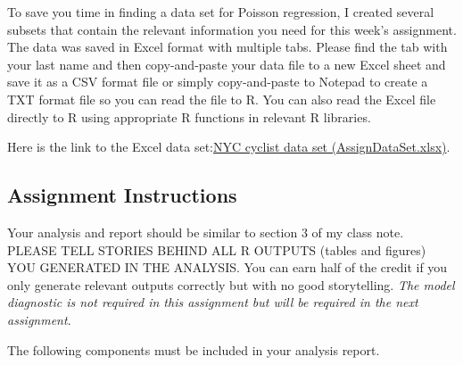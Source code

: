 \documentclass[
]{book}
\begin{document}
To save you time in finding a data set for Poisson regression, I created several subsets that contain the relevant information you need for this week's assignment. The data was saved in Excel format with multiple tabs. Please find the tab with your last name and then copy-and-paste your data file to a new Excel sheet and save it as a CSV format file or simply copy-and-paste to Notepad to create a TXT format file so you can read the file to R. You can also read the Excel file directly to R using appropriate R functions in relevant R libraries.

Here is the link to the Excel data set:\href{https://github.com/pengdsci/datasets/raw/main/w09-AssignDataSet.xlsx}{NYC cyclist data set (AssignDataSet.xlsx)}.

\hypertarget{assignment-instructions}{%
\subsection{Assignment Instructions}\label{assignment-instructions}}

Your analysis and report should be similar to section 3 of my class note. PLEASE TELL STORIES BEHIND ALL R OUTPUTS (tables and figures) YOU GENERATED IN THE ANALYSIS. You can earn half of the credit if you only generate relevant outputs correctly but with no good storytelling. \emph{The model diagnostic is not required in this assignment but will be required in the next assignment}.

The following components must be included in your analysis report.
\end{document}
